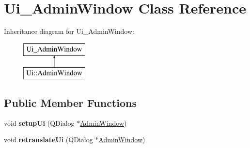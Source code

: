 \hypertarget{class_ui___admin_window}{}\section{Ui\+\_\+\+Admin\+Window Class Reference}
\label{class_ui___admin_window}
Inheritance diagram for Ui\+\_\+\+Admin\+Window\+:\begin{figure}[H]
\begin{center}
\leavevmode
\includegraphics[height=2.000000cm]{class_ui___admin_window}
\end{center}
\end{figure}
\subsection*{Public Member Functions}
\begin{DoxyCompactItemize}
\item 
\mbox{\label{class_ui___admin_window_a66b389d6b188fbaca3e2e8af08e373e0}} 
void {\bfseries setup\+Ui} (Q\+Dialog $\ast$\mbox{\hyperlink{class_admin_window}{Admin\+Window}})
\item 
\mbox{\label{class_ui___admin_window_a2c1707ce7053e1f0924398e5638b6dda}} 
void {\bfseries retranslate\+Ui} (Q\+Dialog $\ast$\mbox{\hyperlink{class_admin_window}{Admin\+Window}})
\end{DoxyCompactItemize}
